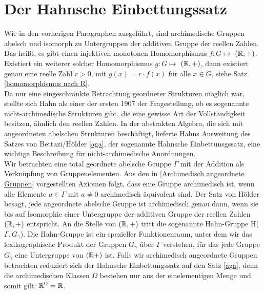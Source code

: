 \section{Der Hahnsche Einbettungssatz}\label{HahnscheEinbettungssatz}
%
Wie in den vorherigen Paragraphen ausgeführt, sind archimedische Gruppen abelsch und isomorph zu Untergruppen der additiven Gruppe der reellen Zahlen. Das heißt, es gibt einen injektiven monotonen Homomorphismus $f\colon G \mapsto$ $\left(\mathbb{R} , +\right)$. Existiert ein weiterer solcher Homomorphismus $g\colon G \mapsto$ $\left(\mathbb{R}, +\right)$, dann existiert genau eine reelle Zahl $r > 0$, mit $g(x) = r\cdot f(x)$ für alle $x \in G$, siehe Satz \ref{homomorphismus nach R}.\\
Da nur eine eingeschränkte Betrachtung geordneter Strukturen möglich war, stellte sich Hahn als einer der ersten 1907 der Fragestellung, ob es sogenannte nicht-archimedische Strukturen gibt, die eine gewisse Art der Vollständigkeit besitzen, ähnlich den reellen Zahlen.\cite{hahn07} In der abstrakten Algebra, die sich mit angeordneten abelschen Strukturen beschäftigt, lieferte Hahns Ausweitung des Satzes von Bettazi/Hölder \ref{aga}, der sogenannte Hahnsche Einbettunsgssatz, eine wichtige Beschreibung für nicht-archimedische Anordnungen. \\
\vspace{0.8cm}
Wir betrachten eine total geordnete abelsche Gruppe $\Gamma$ mit der Addition als Verknüpfung von Gruppenelementen. Aus den in \ref{Archimedisch angeordnete Gruppen} vorgestellten Axiomen folgt, dass eine Gruppe archimedisch ist, wenn alle Elemente $a \in \Gamma$ mit $a \neq 0$ archimedisch äquivalent sind. Der Satz von Hölder besagt, jede angeordnete abelsche Gruppe ist archimedisch genau dann, wenn sie bis auf Isomorphie einer Untergruppe der additiven Gruppe der reellen Zahlen $\left(\mathbb{R}, +\right)$ entspricht. An die Stelle von $\left(\mathbb{R}, +\right)$ tritt die sogenannte Hahn-Gruppe H($\Gamma, G_\gamma$). Die Hahn-Gruppe ist ein spezieller Funktionenraum, unter dem wir das lexikographische Produkt der Gruppen $G_\gamma$ über $\Gamma$ verstehen, für das jede Gruppe $G_\gamma$ eine Untergruppe von $\left(\mathbb{R} +\right)$ ist. Falls wir archimedisch angeordnete Gruppen betrachten reduziert sich der Hahnsche Einbettungssatz auf den Satz \ref{aga}, denn die archimedischen Klassen $\Omega$ bestehen nur aus der einelementigen Menge und somit gilt: $\mathbb{R}^\Omega = \mathbb{R} $.\\
